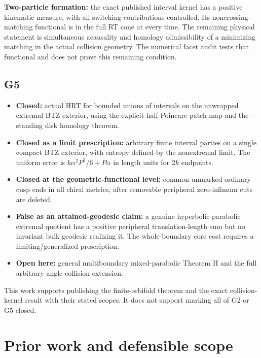 \documentclass[11pt]{article}
\providecommand{\tightlist}{\setlength{\itemsep}{1pt}\setlength{\parskip}{0pt}}
\begin{document}
\textbf{Two-particle formation:} the exact published interval kernel has
a positive kinematic measure, with all switching contributions
controlled. Its noncrossing-matching functional is in the full RT cone
at every time. The remaining physical statement is simultaneous
acausality and homology admissibility of a minimizing matching in the
actual collision geometry. The numerical facet audit tests that
functional and does not prove this remaining condition.

\subsection{G5}\label{g5}

\begin{itemize}
\tightlist
\item
  \textbf{Closed:} actual HRT for bounded unions of intervals on the
  unwrapped extremal BTZ exterior, using the explicit
  half-Poincare-patch map and the standing disk homology theorem.
\item
  \textbf{Closed as a limit prescription:} arbitrary finite interval
  parties on a single compact BTZ exterior, with entropy defined by the
  nonextremal limit. The uniform error is \(k\alpha^2P^2/6+P\alpha\) in
  length units for \(2k\) endpoints.
\item
  \textbf{Closed at the geometric-functional level:} common unmarked
  ordinary cusp ends in all chiral metrics, after removable peripheral
  zero-infimum cuts are deleted.
\item
  \textbf{False as an attained-geodesic claim:} a genuine
  hyperbolic-parabolic extremal quotient has a positive peripheral
  translation-length sum but no invariant bulk geodesic realizing it.
  The whole-boundary core cost requires a limiting/generalized
  prescription.
\item
  \textbf{Open here:} general multiboundary mixed-parabolic Theorem H
  and the full arbitrary-angle collision extension.
\end{itemize}

This work supports publishing the finite-orbifold theorem and the exact
collision-kernel result with their stated scopes. It does not support
marking all of G2 or G5 closed.

\clearpage

\section{Prior work and defensible
scope}\label{prior-work-and-defensible-scope}
\end{document}
